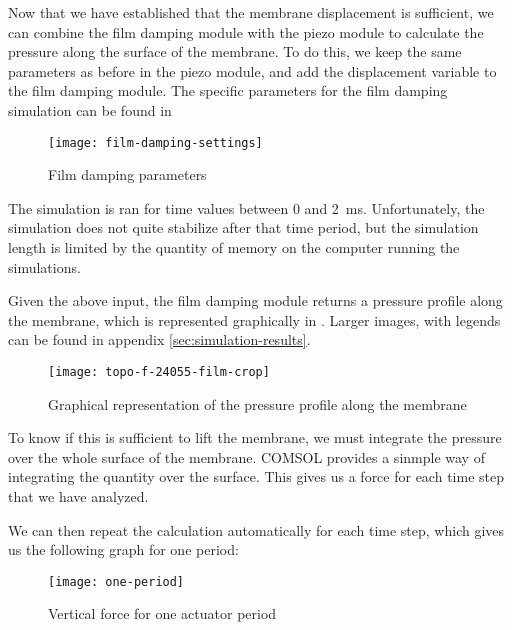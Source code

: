 Now that we have established that the membrane displacement is sufficient, we
can combine the film damping module with the piezo module to calculate the
pressure along the surface of the membrane. To do this, we keep the same
parameters as before in the piezo module, and add the displacement variable to
the film damping module. The specific parameters for the film damping simulation
can be found in 

\begin{figure}[!h]
  \begin{center}
    \texttt{[image: film-damping-settings]}
  \end{center}
  \caption{Film damping parameters}
  \label{fig:film-damping-settings}
\end{figure}

The simulation is ran for time values between 0 and \SI{2}{\milli\second}.
Unfortunately, the simulation does not quite stabilize after that time period,
but the simulation length is limited by the quantity of memory on the computer
running the simulations.

Given the above input, the film damping module returns a pressure profile along
the membrane, which is represented graphically in .
Larger images, with legends can be found in appendix
\ref{sec:simulation-results}.

\begin{figure}[h]
  \begin{center}
    \texttt{[image: topo-f-24055-film-crop]}
  \end{center}
  \caption{Graphical representation of the pressure profile along the membrane}
  \label{fig:pressure-profile}
\end{figure}


To know if this is sufficient to lift the membrane, we must integrate the
pressure over the whole surface of the membrane. COMSOL provides a sinmple way
of integrating the quantity over the surface. This gives us a force for each
time step that we have analyzed.

We can then repeat the calculation automatically for each time step, which gives
us the following graph for one period:

\begin{figure}[h]
  \begin{center}
    \texttt{[image: one-period]}
  \end{center}
  \caption{Vertical force for one actuator period}
  \label{fig:one-period}
\end{figure}

